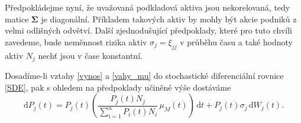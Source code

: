 \documentclass[a4paper,12pt]{report}
\theoremstyle{definition} \newtheorem{definice}[veta]{Definice}
\theoremstyle{remark}
\begin{document}
Předpokládejme nyní, že uvažovaná podkladová aktiva jsou nekorelovaná, tedy matice $\boldsymbol{\Sigma}$ je diagonální.
Příkladem takových aktiv by mohly být akcie podniků z velmi odlišných odvětví.
Další zjednodušující předpoklady, které pro tuto chvíli zavedeme, bude neměnnost rizika aktiv $\sigma_j=\xi_{jj}$ v průběhu času a také hodnoty aktiv $N_j$ nechť jsou v čase konstantní.

Dosadíme-li vztahy \eqref{vynos} a \eqref{vahy_mu} do stochastické diferenciální rovnice \eqref{SDE}, pak s ohledem na předpoklady učiněné výše dostáváme
\begin{equation}  \label{SDE_cen_diag}
\mathrm{d}P_j(t)=P_j(t)\left(\frac{P_j(t)N_j}{\sum_{i=1}^n P_i(t)N_i}\, \mu_M(t)\right)\,\mathrm{d}t+P_j(t)\sigma_{j}\,\mathrm{d}W_j(t).
\end{equation}
\end{document}
